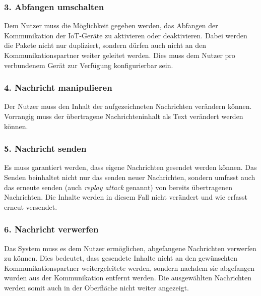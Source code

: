         \subsubsection{3. Abfangen umschalten}
        Dem Nutzer muss die Möglichkeit gegeben werden, das Abfangen der  Kommunikation der \ac{IoT}-Geräte zu aktivieren oder deaktivieren.
        Dabei werden die Pakete nicht nur dupliziert, sondern dürfen auch nicht an den Kommunikationspartner weiter geleitet werden.
        Dies muss dem Nutzer pro verbundenem Gerät zur Verfügung konfigurierbar sein.
        
        \subsubsection{4. Nachricht manipulieren}
        Der Nutzer muss den Inhalt der aufgezeichneten Nachrichten verändern können.
        Vorrangig muss der übertragene Nachrichteninhalt als Text verändert werden können.
        
        \subsubsection{5. Nachricht senden}
        Es muss garantiert werden, dass eigene Nachrichten gesendet werden können.
        Das Senden beinhaltet nicht nur das senden neuer Nachrichten, sondern umfasst auch das erneute senden (auch \emph{replay attack} genannt) von bereits übertragenen Nachrichten. Die Inhalte werden in diesem Fall nicht verändert und wie erfasst erneut versendet.
        
        \subsubsection{6. Nachricht verwerfen}
        Das System muss es dem Nutzer ermöglichen, abgefangene Nachrichten verwerfen zu können.
        Dies bedeutet, dass gesendete Inhalte nicht an den gewünschten Kommunikationspartner weitergeleitete werden, sondern nachdem sie abgefangen wurden aus der Kommunikation entfernt werden.
        Die ausgewählten Nachrichten werden somit auch in der Oberfläche nicht weiter angezeigt.
        
        